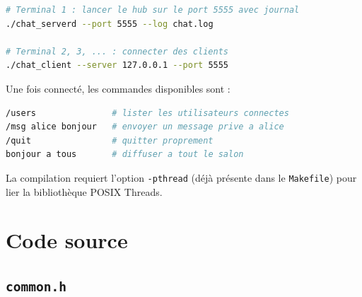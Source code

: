 \documentclass[12pt,a4paper]{article}
\begin{document}
\begin{lstlisting}[language=bash, style=cstyle]
# Terminal 1 : lancer le hub sur le port 5555 avec journal
./chat_serverd --port 5555 --log chat.log

# Terminal 2, 3, ... : connecter des clients
./chat_client --server 127.0.0.1 --port 5555
\end{lstlisting}

Une fois connecté, les commandes disponibles sont :

\begin{lstlisting}[language=bash, style=cstyle]
/users               # lister les utilisateurs connectes
/msg alice bonjour   # envoyer un message prive a alice
/quit                # quitter proprement
bonjour a tous       # diffuser a tout le salon
\end{lstlisting}

La compilation requiert l'option \texttt{-pthread} (déjà présente dans le
\texttt{Makefile}) pour lier la bibliothèque POSIX Threads.

\section{Code source}

\subsection{\texttt{common.h}}
\end{document}
